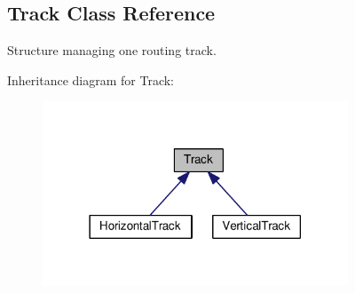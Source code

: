 \hypertarget{classKite_1_1Track}{\subsection{Track Class Reference}
\label{classKite_1_1Track}
}


Structure managing one routing track.  




Inheritance diagram for Track\-:\nopagebreak
\begin{figure}[H]
\begin{center}
\leavevmode
\includegraphics[width=258pt]{classKite_1_1Track__inherit__graph}
\end{center}
\end{figure}

